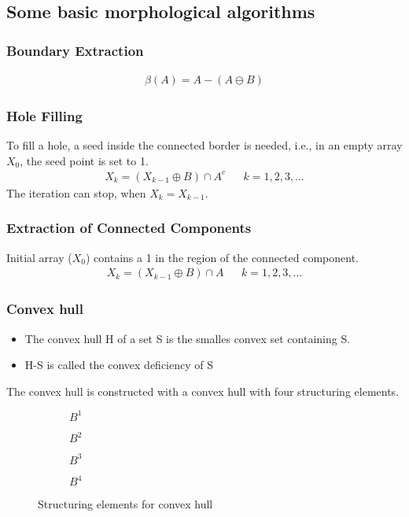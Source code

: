 \subsection{Some basic morphological algorithms}
\subsubsection{Boundary Extraction}
\begin{align*}
\beta(A)=A-(A\ominus B)
\end{align*}
\subsubsection{Hole Filling}
To fill a hole, a seed inside the connected border is needed, i.e., in an empty array $X_0$, the seed point is set to 1.
\begin{align*}
X_k=(X_{k-1}\oplus B)\cap A^c && k=1,2,3,\ldots
\end{align*}
The iteration can stop, when $X_k = X_{k-1}$.
\subsubsection{Extraction of Connected Components}
Initial array ($X_0$) contains a 1 in the region of the connected component.
\begin{align*}
X_k=(X_{k-1}\oplus B)\cap A && k=1,2,3,\ldots
\end{align*}
\subsubsection{Convex hull}
\begin{itemize}
\item The convex hull H of a set S is the smalles convex set containing S.
\item H-S is called the convex deficiency of S
\end{itemize}
The convex hull is constructed with a convex hull with four structuring elements.
\begin{figure}[h]
	\centering
	\begin{subfigure}[b]{0.2\textwidth}
		\centering
		\caption{$B^1$}
	\end{subfigure}
	\begin{subfigure}[b]{0.2\textwidth}
		\centering
		\caption{$B^2$}
	\end{subfigure}
	\begin{subfigure}[b]{0.2\textwidth}
		\centering
		\caption{$B^3$}
	\end{subfigure}
	\begin{subfigure}[b]{0.2\textwidth}
		\centering
		\caption{$B^4$}
	\end{subfigure}
	\caption{Structuring elements for convex hull}
\end{figure}

